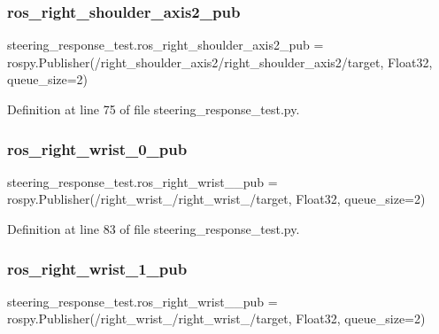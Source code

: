 \subsubsection{\texorpdfstring{ros\_right\_shoulder\_axis2\_pub}{ros\_right\_shoulder\_axis2\_pub}}
{\footnotesize\ttfamily steering\+\_\+response\+\_\+test.\+ros\+\_\+right\+\_\+shoulder\+\_\+axis2\+\_\+pub = rospy.\+Publisher(\textquotesingle{}/right\+\_\+shoulder\+\_\+axis2/right\+\_\+shoulder\+\_\+axis2/target\textquotesingle{}, Float32, queue\+\_\+size=2)}



Definition at line 75 of file steering\+\_\+response\+\_\+test.\+py.

\mbox{\label{namespacesteering__response__test_a963e86f6663042658714e816c8417bbe}} 
\subsubsection{\texorpdfstring{ros\_right\_wrist\_0\_pub}{ros\_right\_wrist\_0\_pub}}
{\footnotesize\ttfamily steering\+\_\+response\+\_\+test.\+ros\+\_\+right\+\_\+wrist\+\_\+\_\+pub = rospy.\+Publisher(\textquotesingle{}/right\+\_\+wrist\+\_/right\+\_\+wrist\+\_/target\textquotesingle{}, Float32, queue\+\_\+size=2)}



Definition at line 83 of file steering\+\_\+response\+\_\+test.\+py.

\mbox{\label{namespacesteering__response__test_aa79661d7d503045aee6c27fe6cc094bf}} 
\subsubsection{\texorpdfstring{ros\_right\_wrist\_1\_pub}{ros\_right\_wrist\_1\_pub}}
{\footnotesize\ttfamily steering\+\_\+response\+\_\+test.\+ros\+\_\+right\+\_\+wrist\+\_\+\_\+pub = rospy.\+Publisher(\textquotesingle{}/right\+\_\+wrist\+\_/right\+\_\+wrist\+\_/target\textquotesingle{}, Float32, queue\+\_\+size=2)}



